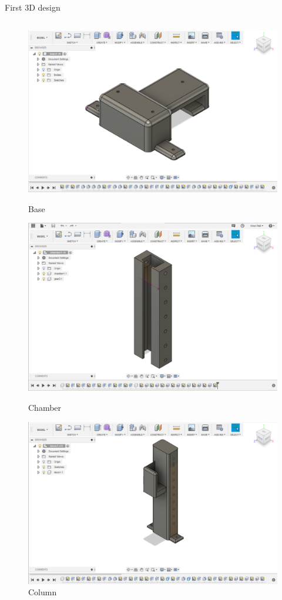 \documentclass[10pt,a4paper]{beamer}
\begin{document}
\begin{frame}{First 3D design}
\begin{columns}
\column{0.5\framewidth}
\begin{figure}
\includegraphics[height=0.2\textheight, width=0.35\framewidth]{Base.png}\caption{\small{Base}}
\includegraphics[height=0.2\textheight,  width=0.35\framewidth]{Chamber.png}\caption{\small{Chamber}}
\includegraphics[height=0.2\textheight,  width=0.35\framewidth]{Column.png}\caption{\small{Column}}

\end{figure}
\end{columns}
\end{frame}
\end{document}
